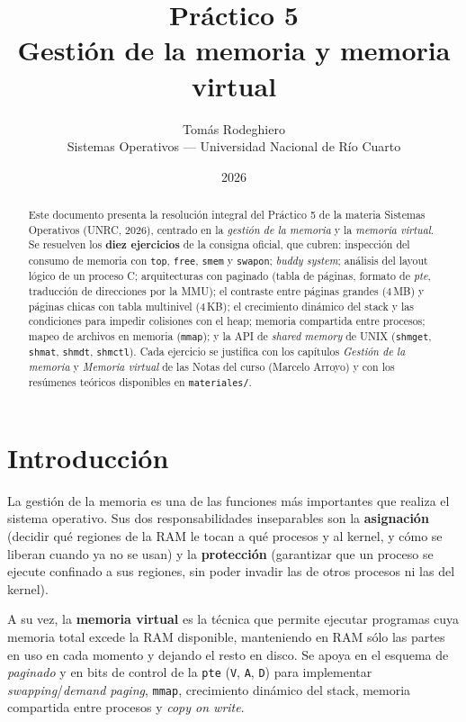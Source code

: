 \documentclass[11pt,a4paper]{article}
\title{
    \vspace{-2.5em}
    \textbf{Práctico 5} \\[0.3em]
    \large Gestión de la memoria y memoria virtual
}
\author{
    Tomás Rodeghiero \\
    \small Sistemas Operativos --- Universidad Nacional de Río Cuarto
}
\date{2026}
\begin{document}
\maketitle

\begin{abstract}
\noindent
Este documento presenta la resolución integral del Práctico 5 de la
materia Sistemas Operativos (UNRC, 2026), centrado en la
\emph{gestión de la memoria} y la \emph{memoria virtual}. Se resuelven
los \textbf{diez ejercicios} de la consigna oficial, que cubren:
inspección del consumo de memoria con \texttt{top}, \texttt{free},
\texttt{smem} y \texttt{swapon}; \emph{buddy system}; análisis del
layout lógico de un proceso C; arquitecturas con paginado (tabla de
páginas, formato de \emph{pte}, traducción de direcciones por la MMU);
el contraste entre páginas grandes ($4$\,MB) y páginas chicas con
tabla multinivel ($4$\,KB); el crecimiento dinámico del stack y las
condiciones para impedir colisiones con el heap; memoria compartida
entre procesos; mapeo de archivos en memoria (\texttt{mmap}); y la
API de \emph{shared memory} de UNIX (\texttt{shmget}, \texttt{shmat},
\texttt{shmdt}, \texttt{shmctl}). Cada ejercicio se justifica con los
capítulos \emph{Gestión de la memoria} y \emph{Memoria virtual} de
las Notas del curso (Marcelo Arroyo) y con los resúmenes teóricos
disponibles en \texttt{materiales/}.
\end{abstract}

\tableofcontents
\bigskip

\section{Introducción}

La gestión de la memoria es una de las funciones más importantes que
realiza el sistema operativo. Sus dos responsabilidades inseparables
son la \textbf{asignación} (decidir qué regiones de la RAM le tocan a
qué procesos y al kernel, y cómo se liberan cuando ya no se usan) y la
\textbf{protección} (garantizar que un proceso se ejecute confinado a
sus regiones, sin poder invadir las de otros procesos ni las del
kernel).

A su vez, la \textbf{memoria virtual} es la técnica que permite
ejecutar programas cuya memoria total excede la RAM disponible,
manteniendo en RAM sólo las partes en uso en cada momento y dejando el
resto en disco. Se apoya en el esquema de \emph{paginado} y en bits de
control de la \texttt{pte} (\texttt{V}, \texttt{A}, \texttt{D}) para
implementar \emph{swapping}/\emph{demand paging}, \texttt{mmap},
crecimiento dinámico del stack, memoria compartida entre procesos y
\emph{copy on write}.
\end{document}
